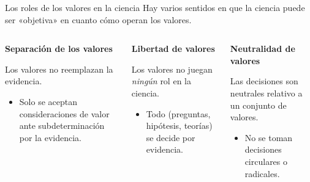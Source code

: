 \documentclass[%
            9pt,
                spanish, %
                    ignorenonframetext,
                    handout, %
                aspectratio=169, %
        ]{beamer}
\providecommand{\tightlist}{}
\begin{document}
\begin{frame}{Los roles de los valores en la ciencia}
\label{los-roles-de-los-valores-en-la-ciencia}
Hay varios sentidos en que la ciencia puede ser «objetiva» en cuanto
cómo operan los valores. \pause

\begin{columns}[T,onlytextwidth]
\begin{column}{0.3\textwidth}
\textbf{Separación de los valores}

\pause

Los valores no reemplazan la evidencia.

\pause

\begin{itemize}
\tightlist
\item
  Solo se aceptan consideraciones de valor ante subdeterminación por la
  evidencia. \pause
\end{itemize}
\end{column}

\begin{column}{0.3\textwidth}
\textbf{Libertad de valores}

\pause

Los valores no juegan \emph{ningún} rol en la ciencia.

\pause

\begin{itemize}
\tightlist
\item
  Todo (preguntas, hipótesis, teorías) se decide por evidencia. \pause
\end{itemize}
\end{column}

\begin{column}{0.3\textwidth}
\textbf{Neutralidad de valores}

\pause

Las decisiones son neutrales relativo a un conjunto de valores.

\pause

\begin{itemize}
\tightlist
\item
  No se toman decisiones circulares o radicales.
\end{itemize}
\end{column}
\end{columns}
\end{frame}
\end{document}
